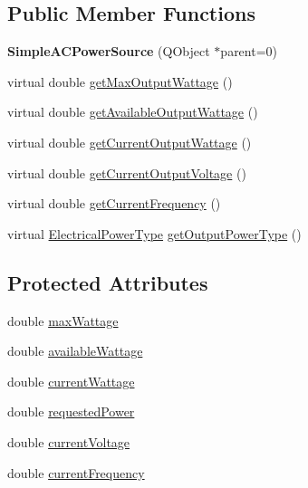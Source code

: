 \subsection*{Public Member Functions}
\begin{DoxyCompactItemize}
\item 
\hypertarget{class_challenger604_systems_1_1_simple_a_c_power_source_afb2f7b55ab007667b09d338c17f477ed}{{\bfseries Simple\-A\-C\-Power\-Source} (Q\-Object $\ast$parent=0)}\label{class_challenger604_systems_1_1_simple_a_c_power_source_afb2f7b55ab007667b09d338c17f477ed}

\item 
virtual double \hyperlink{class_challenger604_systems_1_1_simple_a_c_power_source_af4be658550a6883664eacd3ec5f63068}{get\-Max\-Output\-Wattage} ()
\item 
virtual double \hyperlink{class_challenger604_systems_1_1_simple_a_c_power_source_ab5c1cacdf81531a9bb73edebda3d5c0c}{get\-Available\-Output\-Wattage} ()
\item 
virtual double \hyperlink{class_challenger604_systems_1_1_simple_a_c_power_source_a4e4755ba334156bf6db48e2d53b189d6}{get\-Current\-Output\-Wattage} ()
\item 
virtual double \hyperlink{class_challenger604_systems_1_1_simple_a_c_power_source_a1f88d86aa2bc795732a6a4d3c583ce2b}{get\-Current\-Output\-Voltage} ()
\item 
virtual double \hyperlink{class_challenger604_systems_1_1_simple_a_c_power_source_ad125522705327fe9e78234c70e1e444f}{get\-Current\-Frequency} ()
\item 
virtual \hyperlink{namespace_challenger604_systems_a9ad1a793d94b97514092692cb7315afd}{Electrical\-Power\-Type} \hyperlink{class_challenger604_systems_1_1_simple_a_c_power_source_aaaebd8199288938f6d7955743669193b}{get\-Output\-Power\-Type} ()
\end{DoxyCompactItemize}
\subsection*{Protected Attributes}
\begin{DoxyCompactItemize}
\item 
double \hyperlink{class_challenger604_systems_1_1_simple_a_c_power_source_a52f945e3cf2a2ece8a3d9f772d5cddce}{max\-Wattage}
\item 
double \hyperlink{class_challenger604_systems_1_1_simple_a_c_power_source_af9aab8bb1f32a240aba9b6c4ac969ba9}{available\-Wattage}
\item 
double \hyperlink{class_challenger604_systems_1_1_simple_a_c_power_source_a555e44c4500e6f094e9fb7ca17939648}{current\-Wattage}
\item 
double \hyperlink{class_challenger604_systems_1_1_simple_a_c_power_source_aeae97501266decbd321fe2a934d5f225}{requested\-Power}
\item 
double \hyperlink{class_challenger604_systems_1_1_simple_a_c_power_source_a10506cd4ead6a716f150baaaa4c56888}{current\-Voltage}
\item 
double \hyperlink{class_challenger604_systems_1_1_simple_a_c_power_source_a321cb77fea6e9d7a79fd69d2bd7a7227}{current\-Frequency}
\end{DoxyCompactItemize}


